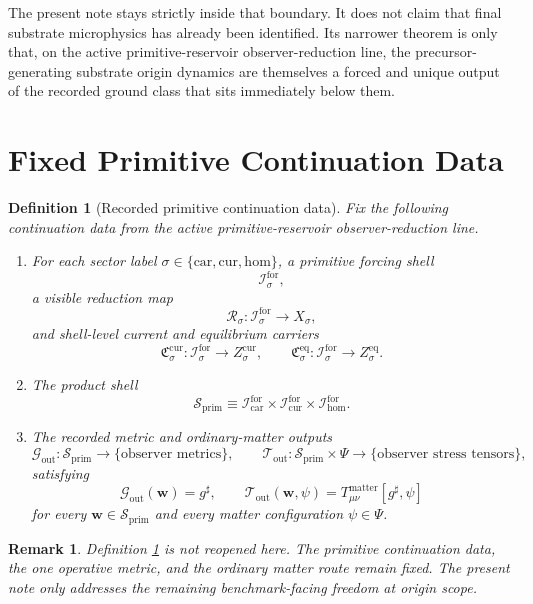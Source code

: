 \documentclass[11pt]{article}
\newcommand{\CompletedMetric}{g^{\sharp}}
\newcommand{\MatterSpace}{\Psi}
\newcommand{\Car}{\mathrm{car}}
\newcommand{\Cur}{\mathrm{cur}}
\newcommand{\Hom}{\mathrm{hom}}
\newcommand{\ForSpace}[1]{\mathcal I_{#1}^{\mathrm{for}}}
\newcommand{\PrimShell}{\mathcal S_{\mathrm{prim}}}
\newcommand{\Reduction}[1]{\mathcal R_{#1}}
\newcommand{\CurrentCarrier}[1]{\mathfrak C_{#1}^{\mathrm{cur}}}
\newcommand{\EqCarrier}[1]{\mathfrak C_{#1}^{\mathrm{eq}}}
\newcommand{\MetricOut}{\mathscr G_{\mathrm{out}}}
\newcommand{\MatterOut}{\mathscr T_{\mathrm{out}}}
\newtheorem{definition}{Definition}
\newtheorem{remark}{Remark}
\begin{document}
The present note stays strictly inside that boundary. It does not claim that final substrate microphysics has already been identified. Its narrower theorem is only that, on the active primitive-reservoir observer-reduction line, the precursor-generating substrate origin dynamics are themselves a forced and unique output of the recorded ground class that sits immediately below them.

\section{Fixed Primitive Continuation Data}

\begin{definition}[Recorded primitive continuation data]
\label{def:fixed}
Fix the following continuation data from the active primitive-reservoir observer-reduction line.
\begin{enumerate}
    \item For each sector label \(\sigma\in\{\Car,\Cur,\Hom\}\), a primitive forcing shell
    \[
    \ForSpace{\sigma},
    \]
    a visible reduction map
    \[
    \Reduction{\sigma}:\ForSpace{\sigma}\to X_{\sigma},
    \]
    and shell-level current and equilibrium carriers
    \[
    \CurrentCarrier{\sigma}:\ForSpace{\sigma}\to Z_{\sigma}^{\mathrm{cur}},
    \qquad
    \EqCarrier{\sigma}:\ForSpace{\sigma}\to Z_{\sigma}^{\mathrm{eq}}.
    \]
    \item The product shell
    \[
    \PrimShell
    \equiv
    \ForSpace{\Car}\times \ForSpace{\Cur}\times \ForSpace{\Hom}.
    \]
    \item The recorded metric and ordinary-matter outputs
    \[
    \MetricOut:\PrimShell\to\{\text{observer metrics}\},
    \qquad
    \MatterOut:\PrimShell\times\MatterSpace\to\{\text{observer stress tensors}\},
    \]
    satisfying
    \begin{equation}
    \MetricOut(\mathbf w)=\CompletedMetric,
    \qquad
    \MatterOut(\mathbf w,\psi)
    =
    T_{\mu\nu}^{\mathrm{matter}}[\CompletedMetric,\psi]
    \label{eq:fixedoutputs}
    \end{equation}
    for every \(\mathbf w\in\PrimShell\) and every matter configuration \(\psi\in\MatterSpace\).
\end{enumerate}
\end{definition}

\begin{remark}
Definition \ref{def:fixed} is not reopened here. The primitive continuation data, the one operative metric, and the ordinary matter route remain fixed. The present note only addresses the remaining benchmark-facing freedom at origin scope.
\end{remark}
\end{document}
